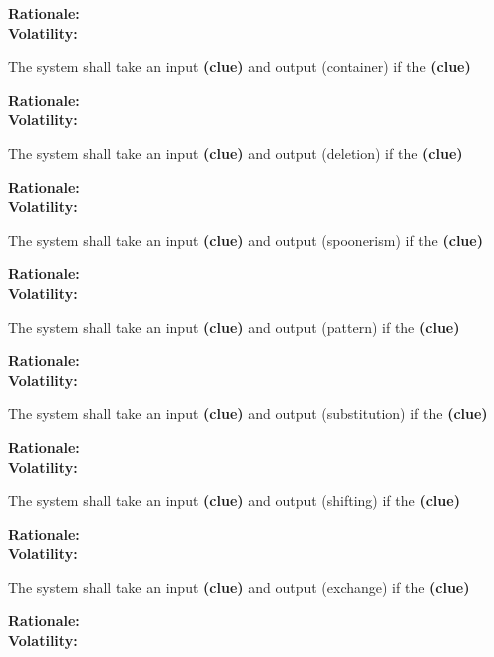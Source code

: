 \textbf{Rationale:}  \\
\textbf{Volatility:} 

\noindent\llap{\textbf{[R19/1]}}The system shall take an input \textbf{(clue)} and output (container) if the \textbf{(clue)}

\textbf{Rationale:}  \\
\textbf{Volatility:} 

\noindent\llap{\textbf{[R20/1]}}The system shall take an input \textbf{(clue)} and output (deletion) if the \textbf{(clue)}

\textbf{Rationale:}  \\
\textbf{Volatility:} 

\noindent\llap{\textbf{[R21/1]}}The system shall take an input \textbf{(clue)} and output (spoonerism) if the \textbf{(clue)}

\textbf{Rationale:}  \\
\textbf{Volatility:} 

\noindent\llap{\textbf{[R22/1]}}The system shall take an input \textbf{(clue)} and output (pattern) if the \textbf{(clue)}

\textbf{Rationale:}  \\
\textbf{Volatility:} 

\noindent\llap{\textbf{[R23/1]}}The system shall take an input \textbf{(clue)} and output (substitution) if the \textbf{(clue)}

\textbf{Rationale:}  \\
\textbf{Volatility:} 

\noindent\llap{\textbf{[R24/1]}}The system shall take an input \textbf{(clue)} and output (shifting) if the \textbf{(clue)}

\textbf{Rationale:}  \\
\textbf{Volatility:} 

\noindent\llap{\textbf{[R25/1]}}The system shall take an input \textbf{(clue)} and output (exchange) if the \textbf{(clue)}

\textbf{Rationale:}  \\
\textbf{Volatility:} 






